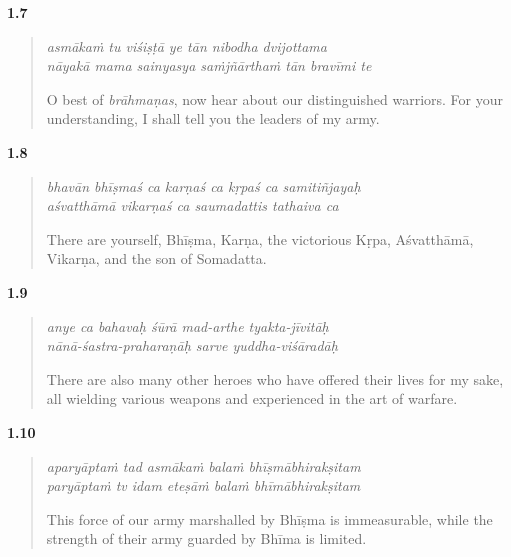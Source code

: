 \par\noindent\textbf{1.7}\par
\begin{verse}
\textit{asmākaṁ tu viśiṣṭā ye tān nibodha dvijottama} \\
\textit{nāyakā mama sainyasya saṁjñārthaṁ tān bravīmi te}

\noindent O best of \textit{brāhmaṇas}, now hear about our distinguished warriors. For your understanding, I shall tell you the leaders of my army.
\end{verse}
\par



\par\noindent\textbf{1.8}\par
\begin{verse}
\textit{bhavān bhīṣmaś ca karṇaś ca kṛpaś ca samitiñjayaḥ} \\
\textit{aśvatthāmā vikarṇaś ca saumadattis tathaiva ca}

\noindent There are yourself, Bhīṣma, Karṇa, the victorious Kṛpa, Aśvatthāmā, Vikarṇa, and the son of Somadatta.
\end{verse}
\par



\par\noindent\textbf{1.9}\par
\begin{verse}
\textit{anye ca bahavaḥ śūrā mad-arthe tyakta-jīvitāḥ} \\
\textit{nānā-śastra-praharaṇāḥ sarve yuddha-viśāradāḥ}

\noindent There are also many other heroes who have offered their lives for my sake, all wielding various weapons and experienced in the art of warfare.
\end{verse}
\par



\par\noindent\textbf{1.10}\par
\begin{verse}
\textit{aparyāptaṁ tad asmākaṁ balaṁ bhīṣmābhirakṣitam} \\
\textit{paryāptaṁ tv idam eteṣāṁ balaṁ bhīmābhirakṣitam}

\noindent This force of our army marshalled by Bhīṣma is immeasurable, while the strength of their army guarded by Bhīma is limited.
\end{verse}
\par



